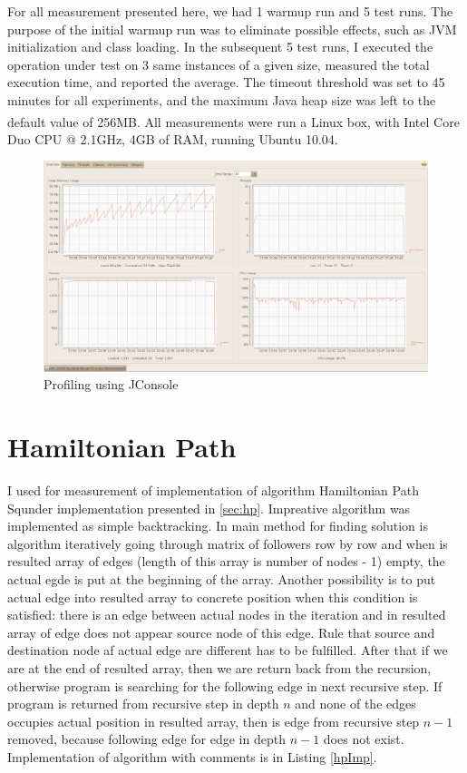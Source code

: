 \documentclass[11pt,twoside,a4paper]{book}
\begin{document}
For all measurement presented here, we had 1 warmup run and 5 test runs. The
purpose of the initial warmup run was to eliminate possible 
effects, such as JVM initialization and class loading. In the subsequent 5 test runs, I executed
the operation under test on 3 same instances of a given
size, measured the total execution time, and reported the
average. The timeout threshold was set to 45 minutes for all experiments, and
the maximum Java heap size was left to the default value of 256MB. All
measurements were run a Linux box, with Intel\textsuperscript{\textregistered}
Core Duo CPU @ 2.1GHz, 4GB of RAM, running Ubuntu 10.04.

\begin{figure}[ht]
\begin{center}
\includegraphics[width=14cm]{figures/jconsole/overview}
\caption{Profiling using JConsole}
\label{fig:pfJC}
\end{center}
\end{figure}


\section{Hamiltonian Path}

I used for measurement of implementation of algorithm Hamiltonian Path Squnder
implementation presented in \ref{sec:hp}. Impreative algorithm was implemented
as simple backtracking. In main method for finding solution is algorithm
iteratively going through matrix of followers row by row and when is resulted
array of edges (length of this array is number of nodes - 1) empty, the actual
egde is put at the beginning of the array. Another possibility is to put actual
edge into resulted array to concrete position when this condition is satisfied:
there is an edge between actual nodes in the iteration and in resulted array of
edge does not appear source node of this edge. Rule that source and destination
node af actual edge are different has to be fulfilled. After that if we are at
the end of resulted array, then we are return back from the recursion, otherwise
program is searching for the following edge in next recursive step. If program
is returned from recursive step in depth $n$ and none of the edges occupies
actual position in resulted array, then is edge from recursive step $n - 1$
removed, because following edge for edge in depth $n-1$ does not exist.
Implementation of algorithm with comments is in Listing \ref{hpImp}.
\end{document}
